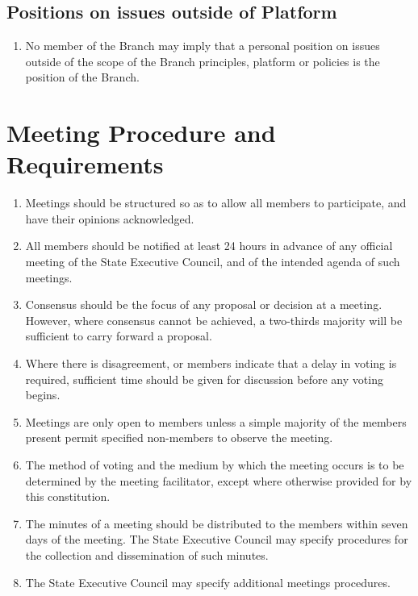 \documentclass[a4paper,titlepage,8.5pt]{article}
\newcommand{\stateorterritory}{State}
\begin{document}
\subsection{Positions on issues outside of Platform}

\begin{enumerate}
\item No member of the Branch may imply that a personal position on issues outside of the scope of the Branch principles, platform or policies is the position of the Branch.
\end{enumerate}

\section{Meeting Procedure and Requirements}

\begin{enumerate}
\item Meetings should be structured so as to allow all members to participate, and have their opinions acknowledged.
\item All members should be notified at least 24 hours in advance of any official meeting of the {\stateorterritory} Executive Council, and of the intended agenda of such meetings.
\item Consensus should be the focus of any proposal or decision at a meeting. However, where consensus cannot be achieved, a two-thirds majority will be sufficient to carry forward a proposal.
\item Where there is disagreement, or members indicate that a delay in voting is required, sufficient time should be given for discussion before any voting begins.
\item Meetings are only open to members unless a simple majority of the members present permit specified non-members to observe the meeting.
\item The method of voting and the medium by which the meeting occurs is to be determined by the meeting facilitator, except where otherwise provided for by this constitution.
\item The minutes of a meeting should be distributed to the members within seven days of the meeting. The {\stateorterritory} Executive Council may specify procedures for the collection and dissemination of such minutes.
\item The {\stateorterritory} Executive Council may specify additional meetings procedures.
\end{enumerate}
\end{document}
